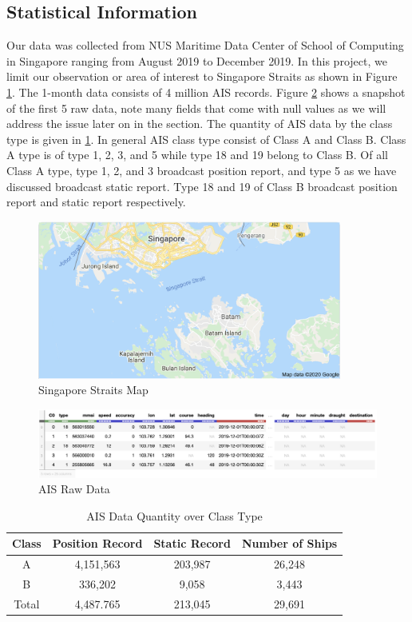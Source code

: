\subsection{Statistical Information}
Our data was collected from NUS Maritime Data Center of School of Computing in Singapore ranging from August 2019 to December 2019. In this project, we limit our observation or area of interest to Singapore Straits as shown in Figure \ref{fig:straits}. The 1-month data consists of 4 million AIS records. Figure \ref{fig:records} shows a snapshot of the first 5 raw data, note many fields that come with null values as we will address the issue later on in the section. The quantity of AIS data by the class type is given in \ref{tab:table1}. In general AIS class type consist of Class A and Class B. Class A type is of type 1, 2, 3, and 5 while type 18 and 19 belong to Class B. Of all Class A type, type 1, 2, and 3 broadcast position report, and type 5 as we have discussed broadcast static report. Type 18 and 19 of Class B broadcast position report and static report respectively. 

\begin{figure}[t!]
    \centering
    \includegraphics[width=10cm]{pic/ch-eda/sg_straits.png}
    \caption{Singapore Straits Map}
    \label{fig:straits}
\end{figure}

\begin{figure}[t!]
    \centering
    \includegraphics[width=14cm]{pic/ch-eda/overview_ais_records.png}
    \caption{AIS Raw Data}
    \label{fig:records}
\end{figure}

\begin{table}[t!]
    \centering
    \caption{AIS Data Quantity over Class Type}
    \label{tab:table1}
    \begin{tabular}{c|c|c|c}
      \textbf{Class} & \textbf{Position Record} & \textbf{Static Record} & \textbf{Number of Ships}\\
      \hline
      A & 4,151,563 & 203,987 & 26,248\\
      B & 336,202 & 9,058 & 3,443\\
      Total & 4,487.765 & 213,045 & 29,691\\
    \end{tabular}
\end{table}

